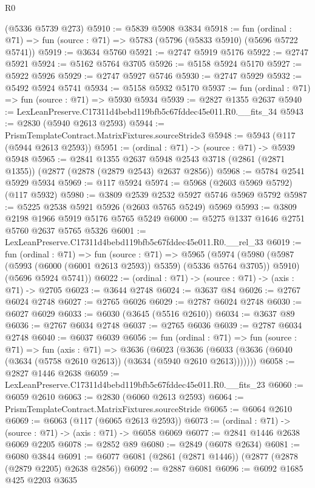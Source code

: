 \begin{lexlean}{R0}
\begin{coremodule}
    (@5336 @5739 @273)
@5910 := @5839 @5908 @3834
@5918 := fun (ordinal : @71) =>
  fun (source : @71) => @5783 (@5796 (@5833 @5910) (@5696 @5722 @5741))
@5919 := @3634 @5760
@5921 := @2747 @5919 @5176
@5922 := @2747 @5921
@5924 := @5162 @5764 @3705
@5926 := @5158 @5924 @5170
@5927 := @5922 @5926
@5929 := @2747 @5927 @5746
@5930 := @2747 @5929
@5932 := @5492 @5924 @5741
@5934 := @5158 @5932 @5170
@5937 := fun (ordinal : @71) => fun (source : @71) => @5930 @5934
@5939 := @2827 @1355 @2637
@5940 := LexLeanPreserve.C17311d4bebd119bfb5c67fddec45e011.R0.__fits_34
@5943 := @2830 (@5940 @2613 @2593)
@5944 := PrismTemplateContract.MatrixFixtures.sourceStride3
@5948 := @5943 (@117 (@5944 @2613 @2593))
@5951 := (ordinal : @71) -> (source : @71) -> @5939 @5948
@5965 := @2841
    @1355
    @2637
    @5948
    @2543
    @3718
    (@2861 (@2871 @1355))
    (@2877 (@2878 (@2879 @2543) @2637 @2856))
@5968 := @5784 @2541 @5929 @5934
@5969 := @117 @5924
@5974 := @5968 (@2603 @5969 @5792) (@117 @5932)
@5980 := @3809 @2539 @2532 @5927 @5746 @5969 @5792
@5987 := @5225 @2538 @5921 @5926 (@2603 @5765 @5249) @5969
@5993 := @3809 @2198 @1966 @5919 @5176 @5765 @5249
@6000 := @5275 @1337 @1646 @2751 @5760 @2637 @5765 @5326
@6001 := LexLeanPreserve.C17311d4bebd119bfb5c67fddec45e011.R0.__rel_33
@6019 := fun (ordinal : @71) =>
  fun (source : @71) =>
  @5965
    (@5974
      (@5980 (@5987 (@5993 (@6000 (@6001 @2613 @2593)) @5359) (@5336 @5764 @3705)) @5910)
      (@5696 @5924 @5741))
@6022 := (ordinal : @71) -> (source : @71) -> (axis : @71) -> @2705
@6023 := @3644 @2748
@6024 := @3637 @84
@6026 := @2767 @6024 @2748
@6027 := @2765 @6026
@6029 := @2787 @6024 @2748
@6030 := @6027 @6029
@6033 := @6030 (@3645 (@5516 @2610))
@6034 := @3637 @89
@6036 := @2767 @6034 @2748
@6037 := @2765 @6036
@6039 := @2787 @6034 @2748
@6040 := @6037 @6039
@6056 := fun (ordinal : @71) =>
  fun (source : @71) =>
  fun (axis : @71) =>
  @3636
    (@6023 (@3636 (@6033 (@3636 (@6040 (@3634 (@5758 @2610 @2613)) (@3634 (@5940 @2610 @2613)))))))
@6058 := @2827 @1446 @2638
@6059 := LexLeanPreserve.C17311d4bebd119bfb5c67fddec45e011.R0.__fits_23
@6060 := @6059 @2610
@6063 := @2830 (@6060 @2613 @2593)
@6064 := PrismTemplateContract.MatrixFixtures.sourceStride
@6065 := @6064 @2610
@6069 := @6063 (@117 (@6065 @2613 @2593))
@6073 := (ordinal : @71) -> (source : @71) -> (axis : @71) -> @6058 @6069
@6077 := @2841 @1446 @2638 @6069 @2205
@6078 := @2852 @89
@6080 := @2849 (@6078 @2634)
@6081 := @6080 @3844
@6091 := @6077 @6081 (@2861 (@2871 @1446)) (@2877 (@2878 (@2879 @2205) @2638 @2856))
@6092 := @2887 @6081
@6096 := @6092 @1685 @425 @2203 @3635

\end{coremodule}
\end{lexlean}
